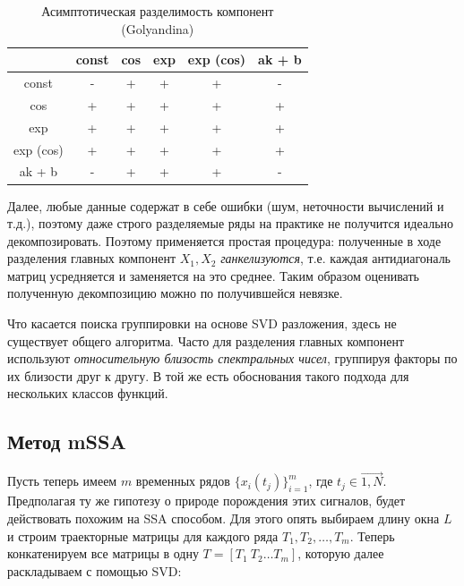 	    	\begin{table}[h]
	    		\centering
	    		\caption{Асимптотическая разделимость компонент (Golyandina)}\label{tab:asympt_devis}
	    		\begin{tabular}{|c|c|c|c|c|c|}
	    			\hline
	    			& const & cos & exp & exp (cos) & ak + b \\ \hline
	    			const     & -     & +   & +   & +         & -      \\ \hline
	    			cos       & +     & +   & +   & +         & +      \\ \hline
	    			exp       & +     & +   & +   & +         & +      \\ \hline
	    			exp (cos) & +     & +   & +   & +         & +      \\ \hline
	    			ak + b    & -     & +   & +   & +         & -      \\ \hline
	    		\end{tabular}
	    	\end{table}
	    	
	    	Далее, любые данные содержат в себе ошибки (шум, неточности вычислений и т.д.), поэтому даже строго разделяемые ряды на практике не получится идеально декомпозировать. Поэтому применяется простая процедура: полученные в ходе разделения главных компонент $ X_1, X_2 $ \textit{ганкелизуются}, т.е. каждая антидиагональ матриц усредняется и заменяется на это среднее. Таким образом оценивать полученную декомпозицию можно по получившейся невязке. 
	    	
	    	
	    	Что касается поиска группировки на основе SVD разложения, здесь не существует общего алгоритма. Часто для разделения главных компонент используют \textit{относительную близость спектральных чисел}, группируя факторы по их близости друг к другу. В той же \cite{ecfb9dc578be43ae9ee8fc88b8ff9151} есть  обоснования такого подхода для нескольких классов функций.	    	
	    	
	    	
			\subsection*{Метод mSSA}
			
			Пусть теперь имеем $ m $ временных рядов $ \{x_i(t_j)\}_{i = 1}^{m} $, где $ t_j \in \overrightarrow{1, N} $. Предполагая ту же гипотезу о природе порождения этих сигналов, будет действовать похожим на SSA способом. Для этого опять выбираем длину окна $ L $ и строим траекторные матрицы для каждого ряда $ T_1, T_2, \ldots , T_m  $. Теперь конкатенируем все матрицы в одну $ T = [T_1 \  T_2 \ldots T_m] $, которую далее раскладываем с помощью SVD:
			
